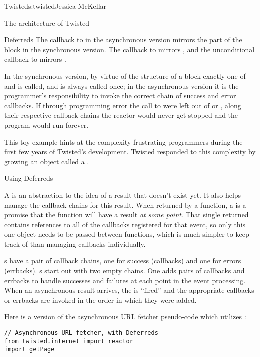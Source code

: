 \begin{aosachapter}{Twisted}{s:twisted}{Jessica McKellar}
\begin{aosasect1}{The architecture of Twisted}
\begin{aosasect2}{Deferreds}
The callback to  in the asynchronous version mirrors the
 part of the  block in the synchronous
version. The callback to  mirrors , and
the unconditional callback to  mirrors
.

In the synchronous version, by virtue of the structure of a
 block exactly one of  and
 is called, and  is always
called once; in the asynchronous version it is the programmer's responsibility
to invoke the correct chain of success and error callbacks. If through
programming error the call to  were left out of
 or , along their respective
callback chains the reactor would never get stopped and the program would run
forever.

This toy example hints at the complexity frustrating programmers during the
first few years of Twisted's development. Twisted responded to this complexity
by growing an object called a .

\begin{aosasect3}{Using Deferreds}

A  is an abstraction to the idea of a result that
doesn't exist yet. It also helps manage the callback chains for this
result. When returned by a function, a  is a promise
that the function will have a result \emph{at some point}. That single
returned  contains references to all of the callbacks
registered for that event, so only this one object needs to be passed
between functions, which is much simpler to keep track of than
managing callbacks individually.

s have a pair of callback chains, one for success
(callbacks) and one for errors (errbacks). s start out with
two empty chains. One adds pairs of callbacks and errbacks to handle successes
and failures at each point in the event processing. When an asynchronous result
arrives, the  is ``fired'' and the appropriate callbacks or
errbacks are invoked in the order in which they were added.

Here is a version of the asynchronous URL fetcher pseudo-code which
utilizes :

\begin{verbatim}
// Asynchronous URL fetcher, with Deferreds
from twisted.internet import reactor
import getPage


\end{verbatim}
\end{aosasect3}
\end{aosasect2}
\end{aosasect1}
\end{aosachapter}
